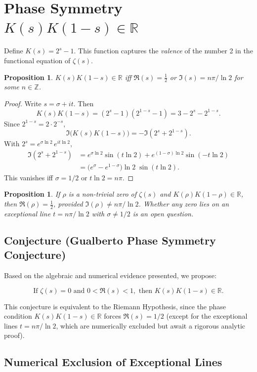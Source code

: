 \documentclass[12pt,a4paper]{article}
\theoremstyle{plain}
\newtheorem{proposition}[theorem]{Proposition}
\begin{document}
\section{Phase Symmetry $K(s)K(1-s)\in\mathbb{R}$}
\label{sec:phase}

Define $K(s)=2^s-1$.  This function captures the {\it valence} of
the number 2 in the functional equation of $\zeta(s)$.

\begin{proposition}
\label{prop:symmetry}
$K(s)K(1-s)\in\mathbb{R}$ iff $\Re(s)=\tfrac12$ or
$\Im(s)=n\pi/\ln2$ for some $n\in\mathbb{Z}$.
\end{proposition}
\begin{proof}
Write $s=\sigma+it$.  Then
\[
K(s)K(1-s) = (2^s-1)(2^{1-s}-1) = 3 - 2^s - 2^{1-s}.
\]
Since $2^{1-s}=2\cdot2^{-s}$,
\[
\Im\bigl(K(s)K(1-s)\bigr) = -\Im(2^s + 2^{1-s}).
\]
With $2^s = e^{\sigma\ln2}\,e^{it\ln2}$,
\begin{align*}
\Im(2^s + 2^{1-s})
&= e^{\sigma\ln2}\sin(t\ln2)
   + e^{(1-\sigma)\ln2}\sin(-t\ln2)\\
&= \bigl(e^{\sigma} - e^{1-\sigma}\bigr)\ln2\;\sin(t\ln2).
\end{align*}
This vanishes iff $\sigma=1/2$ or $t\ln2=n\pi$.
\end{proof}

\begin{proposition}
\label{teo:equiv}
If $\rho$ is a non-trivial zero of $\zeta(s)$ and
$K(\rho)K(1-\rho)\in\mathbb{R}$, then $\Re(\rho)=\tfrac12$,
provided $\Im(\rho)\neq n\pi/\ln2$.  Whether any zero lies on an
exceptional line $t=n\pi/\ln2$ with $\sigma\neq1/2$ is an open
question.
\end{proposition}

\subsection*{Conjecture (Gualberto Phase Symmetry Conjecture)}

Based on the algebraic and numerical evidence presented, we propose:

\[
\boxed{
\text{If }\zeta(s)=0\text{ and }0<\Re(s)<1,\text{ then }K(s)K(1-s)\in\mathbb{R}.
}
\]

This conjecture is equivalent to the Riemann Hypothesis, since the
phase condition $K(s)K(1-s)\in\mathbb{R}$ forces $\Re(s)=1/2$
(except for the exceptional lines $t=n\pi/\ln2$, which are
numerically excluded but await a rigorous analytic proof).

\subsection{Numerical Exclusion of Exceptional Lines}
\end{document}
